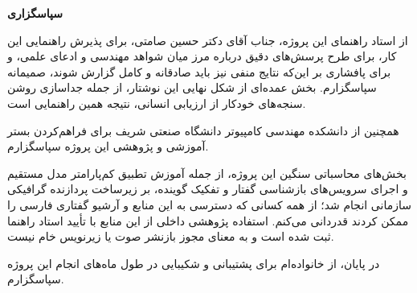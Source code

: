 

\begin{center}
\textbf{سپاسگزاری}
\end{center}
\noindent

از استاد راهنمای این پروژه، جناب آقای دکتر حسین صامتی، برای پذیرش راهنمایی این
کار، برای طرح پرسش‌های دقیق درباره مرز میان شواهد مهندسی و ادعای علمی، و برای
پافشاری بر این‌که نتایج منفی نیز باید صادقانه و کامل گزارش شوند، صمیمانه
سپاسگزارم. بخش عمده‌ای از شکل نهایی این نوشتار، از جمله جداسازی روشن سنجه‌های
خودکار از ارزیابی انسانی، نتیجه همین راهنمایی است.

همچنین از دانشکده مهندسی کامپیوتر دانشگاه صنعتی شریف برای فراهم‌کردن بستر
آموزشی و پژوهشی این پروژه سپاسگزارم.

بخش‌های محاسباتی سنگین این پروژه، از جمله آموزش تطبیق کم‌پارامتر مدل مستقیم و
اجرای سرویس‌های بازشناسی گفتار و تفکیک گوینده، بر زیرساخت پردازنده گرافیکی
سازمانی انجام شد؛ از همه کسانی که دسترسی به این منابع و آرشیو گفتاری فارسی را
ممکن کردند قدردانی می‌کنم. استفاده پژوهشی داخلی از این منابع با تأیید استاد
راهنما ثبت شده است و به معنای مجوز بازنشر صوت یا زیرنویس خام نیست.

در پایان، از خانواده‌ام برای پشتیبانی و شکیبایی در طول ماه‌های انجام این پروژه
سپاسگزارم.

\newpage
